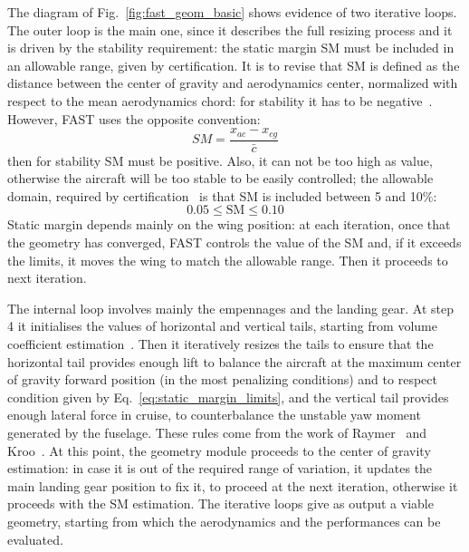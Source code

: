 The diagram of Fig.~\ref{fig:fast_geom_basic} shows evidence of two iterative loops.
The outer loop is the main one, since it describes the full resizing process and it is driven by the stability requirement: the static margin SM must be included in an allowable range, given by certification. 
It is to revise that SM is defined as the distance between the center of gravity and aerodynamics center, normalized with respect to the mean aerodynamics chord: for stability it has to be negative~\cite{bib:anderson_perfo, bib:roskam_perfo}. 
However, FAST uses the opposite convention:
\begin{equation}
\label{eq:static_margin_def}
SM = \frac{x_{ac}-x_{cg}}{\bar{c}} 
\end{equation}
then for stability SM must be positive. 
Also, it can not be too high as value, otherwise the aircraft will be too stable to be easily controlled; the allowable domain, required by certification~\cite{bib:airbus_notes} is that SM is included between 5 and 10\%:
\begin{equation}
\label{eq:static_margin_limits}
0.05 \leq \textrm{SM} \leq 0.10
\end{equation}
Static margin depends mainly on the wing position: at each iteration, once that the geometry has converged, FAST controls the value of the SM and, if it exceeds the limits, it moves the wing to match the allowable range.
Then it proceeds to next iteration. 

The internal loop involves mainly the empennages and the landing gear.
At step 4 it initialises the values of horizontal and vertical tails, starting from volume coefficient estimation~\cite{bib:anderson_perfo}. 
Then it iteratively resizes the tails to ensure that the horizontal tail provides enough lift to balance the aircraft at the maximum center of gravity forward position (in the most penalizing conditions) and to respect condition given by Eq.~\eqref{eq:static_margin_limits}, and the vertical tail provides enough lateral force in cruise, to counterbalance the unstable yaw moment generated by the fuselage. 
These rules come from the work of Raymer~\cite{bib:raymer} and Kroo~\cite{bib:kroo_2001}.
At this point, the geometry module proceeds to the center of gravity estimation: in case it is out of the required range of variation, it updates the main landing gear position to fix it, to proceed at the next iteration, otherwise it proceeds with the SM estimation. 
The iterative loops give as output a viable geometry, starting from which the aerodynamics and the performances can be evaluated.

